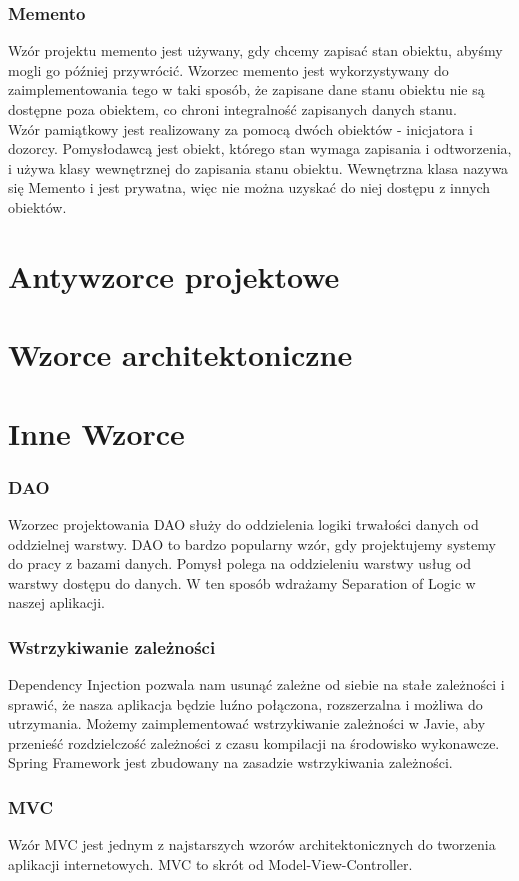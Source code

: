 \documentclass[12pt,a4paper]{article}
\begin{document}
	\section{Memento}
	Wzór projektu memento jest używany, gdy chcemy zapisać stan obiektu, abyśmy mogli go później przywrócić. Wzorzec memento jest wykorzystywany do zaimplementowania tego w taki sposób, że zapisane dane stanu obiektu nie są dostępne poza obiektem, co chroni integralność zapisanych danych stanu.\\
	Wzór pamiątkowy jest realizowany za pomocą dwóch obiektów - inicjatora i dozorcy. Pomysłodawcą jest obiekt, którego stan wymaga zapisania i odtworzenia, i używa klasy wewnętrznej do zapisania stanu obiektu. Wewnętrzna klasa nazywa się Memento i jest prywatna, więc nie można uzyskać do niej dostępu z innych obiektów\cite{PankajKumar}.
	\part{Antywzorce projektowe}
	
	\part{Wzorce architektoniczne}
	\part{Inne Wzorce}
	\section{DAO}
	Wzorzec projektowania DAO służy do oddzielenia logiki trwałości danych od oddzielnej warstwy. DAO to bardzo popularny wzór, gdy projektujemy systemy do pracy z bazami danych. Pomysł polega na oddzieleniu warstwy usług od warstwy dostępu do danych. W ten sposób wdrażamy Separation of Logic w naszej aplikacji\cite{PankajKumar}.
	
	\section{Wstrzykiwanie zależności}
	Dependency Injection pozwala nam usunąć zależne od siebie na stałe zależności i sprawić, że nasza aplikacja będzie luźno połączona, rozszerzalna i możliwa do utrzymania. Możemy zaimplementować wstrzykiwanie zależności w Javie, aby przenieść rozdzielczość zależności z czasu kompilacji na środowisko wykonawcze. Spring Framework jest zbudowany na zasadzie wstrzykiwania zależności\cite{PankajKumar}.
		\section{MVC}
	Wzór MVC jest jednym z najstarszych wzorów architektonicznych do tworzenia aplikacji internetowych. MVC to skrót od Model-View-Controller\cite{PankajKumar}.	
	\tableofcontents
	
	
\end{document}

